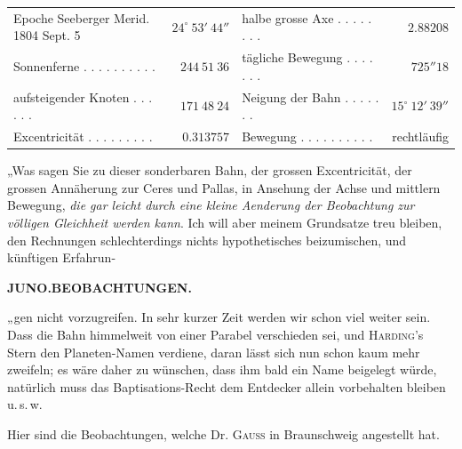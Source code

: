 \begin{center}
\begingroup\fontsize{8.5}{10.5}\selectfont\setlength{\tabcolsep}{2pt}\renewcommand{\arraystretch}{1.12}
\begin{tabular}{@{}lr|lr@{}}
\shortstack[l]{Epoche Seeberger Merid.\\1804 Sept. 5} & $24^\circ\ 53'\ 44''$ & halbe grosse Axe . . . . . . . . & $2.88208$ \\
Sonnenferne . . . . . . . . . . & $244\ 51\ 36$ & tägliche Bewegung . . . . . . . & $725''18$ \\
aufsteigender Knoten . . . . . . & $171\ 48\ 24$ & Neigung der Bahn . . . . . . . & $15^\circ\ 12'\ 39''$ \\
Excentricität . . . . . . . . . & $0.313757$ & Bewegung . . . . . . . . . . & rechtläufig \\
\end{tabular}\endgroup
\end{center}

\par\indent „Was sagen Sie zu dieser sonderbaren Bahn, der grossen Excentricität, der grossen
Annäherung zur Ceres und Pallas, in Ansehung der Achse und mittlern Bewegung,
\textit{die gar leicht durch eine kleine Aenderung der Beobachtung zur völligen
Gleichheit werden kann}. Ich will aber meinem Grundsatze treu bleiben, den Rechnungen
schlechterdings nichts hypothetisches beizumischen, und künftigen Erfahrun-\par
\clearpage
\thispagestyle{empty}
\noindent{}%
\makebox[12mm][l]{}%
\parbox[t]{\dimexpr\linewidth-24mm\relax}{\centering\footnotesize\bfseries JUNO.\enspace BEOBACHTUNGEN.\par}%
\par\nobreak\medskip
\noindent „gen nicht vorzugreifen. In sehr kurzer Zeit werden wir schon viel weiter sein. Dass die
Bahn himmelweit von einer Parabel verschieden sei, und \textsc{Harding}'s Stern den
Planeten-Namen verdiene, daran lässt sich nun schon kaum mehr zweifeln; es wäre
daher zu wünschen, dass ihm bald ein Name beigelegt würde, natürlich muss das
Baptisations-Recht dem Entdecker allein vorbehalten bleiben u.\,s.\,w.

\par\indent Hier sind die Beobachtungen, welche Dr. \textsc{Gauss} in Braunschweig angestellt hat.

